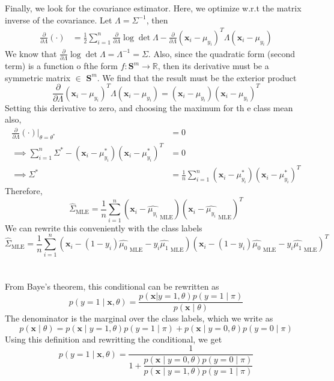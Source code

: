 \documentclass{article}
\numberwithin{equation}{section}
\begin{document}
Finally, we look for the covariance estimator. Here, we optimize w.r.t the matrix inverse of the covariance. Let $\Lambda = \Sigma^{-1}$, then
\begin{align}
\frac{\partial}{\partial \Lambda} (\cdot) &= \frac{1}{2}\sum_{i = 1}^n  \frac{\partial}{\partial \Lambda}\log \det\Lambda -  \frac{\partial}{\partial \Lambda}(\mathbf{x}_i - \mu_{y_i})^T\Lambda (\mathbf{x}_i - \mu_{y_i})
\end{align}
We know that $\frac{\partial}{\partial \Lambda}\log \det\Lambda = \Lambda^{-1} = \Sigma$. Also, since the quadratic form (second term) is a function o fthe form $f: \mathbf{S}^m \rightarrow \mathbb{R}$, then its derivative must be a symmetric matrix $\in$ $\mathbf{S}^m$. We find that the result must be the exterior product
$$
 \frac{\partial}{\partial \Lambda}(\mathbf{x}_i - \mu_{y_i})^T\Lambda (\mathbf{x}_i - \mu_{y_i}) = (\mathbf{x}_i - \mu_{y_i}) (\mathbf{x}_i - \mu_{y_i})^T
$$
Setting this derivative to zero, and choosing the maximum for th
e class mean also,
\begin{align}
\frac{\partial}{\partial \Lambda} (\cdot)\bigg|_{\theta = \theta^*} &=  0 \\
\implies \sum_{i = 1}^n \Sigma^* - (\mathbf{x}_i - \mu_{y_i}^*) (\mathbf{x}_i - \mu_{y_i}^*)^T & = 0 \\
\implies \Sigma^* &= \frac{1}{n}\sum_{i = 1}^n (\mathbf{x}_i - \mu_{y_i}^*) (\mathbf{x}_i - \mu_{y_i}^*)^T
\end{align}
Therefore,
$$
\hat{\Sigma}_{\text{MLE}} = \frac{1}{n}\sum_{i = 1}^n (\mathbf{x}_i -  \hat{\mu_{y_i}}_{\text{ MLE}}) (\mathbf{x}_i - \hat{\mu_{y_i}}_{\text{ MLE}})^T
$$
We can rewrite this conveniently with the class labels
$$
\boxed{\hat{\Sigma}_{\text{MLE}} = \frac{1}{n}\sum_{i = 1}^n (\mathbf{x}_i -  (1 - y_i)\hat{\mu_0}_{\text{ MLE}} - y_i\hat{\mu_1}_{\text{ MLE}}) (\mathbf{x}_i - (1 - y_i)\hat{\mu_0}_{\text{ MLE}} - y_i\hat{\mu_1}_{\text{ MLE}})^T }
$$

\section{}
From Baye's theorem, this conditional can be rewritten as
$$
p(y = 1\mid \mathbf{x}, \theta) = \frac{p(\mathbf{x} | y = 1, \theta) p(y=1 \mid  \pi)}{p(\mathbf{x} \mid \theta)}
$$
The denominator is the marginal over the class labels, which we write as
$$
p(\mathbf{x} \mid \theta) = p(\mathbf{x} \mid y=1 , \theta)p(y=1 \mid \pi) + p(\mathbf{x} \mid y =0, \theta) p(y=0 \mid \pi)
$$
Using this definition and rewritting the conditional, we get
$$
p(y = 1\mid \mathbf{x}, \theta) = \frac{1}{1 + \dfrac{ p(\mathbf{x} \mid y =0, \theta) p(y=0 \mid \pi)}{p(\mathbf{x} \mid y = 1, \theta) p(y=1 \mid  \pi)}}
$$
\end{document}
